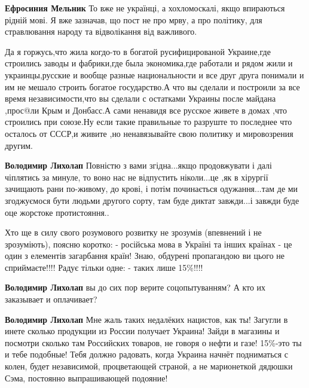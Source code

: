 \begin{itemize}
\begin{itemize}

\textbf{Ефросиния Мельник} То вже не українці, а хохломоскалі, якщо впираються рідній мові.
Я вже зазначав, що пост не про мрву, а про політику, для стравлювання народу та
відволікання від важливого.


Да я горжусь,что жила когдо-то в богатой русифицированой Украине,где строились заводы и фабрики,где была экономика,где работали и рядом жили и украинцы,русские и вообще разные национальности и все друг друга понимали и им не мешало строить богатое государство.А что вы сделали и построили за все время независимости,что вы сделали с остатками Украины после майдана ,прос@ли Крым и Донбасс.А сами ненавидя все русское живете в домах ,что строились при союзе.Ну если такие правильные то разруште то последнее что осталось от СССР,и живите ,но ненавязывайте свою политику и мировозрения другим.

\textbf{Володимир Лихолап} Повністю з вами згідна...якщо продовжувати і далі
чіплятись за минуле, то воно нас не відпустить ніколи...це ,як в
хірургії зачищають рани по-живому, до крові, і потім починається
одужання...там де ми згоджуємося бути людьми другого сорту, там буде диктат
завжди...і завжди буде оце жорстоке протистояння..
\end{itemize}


Хто ще в силу свого розумового розвитку не зрозумів (впевнений і не
зрозуміють), поясню коротко: - російська мова в Україні та інших країнах - це
один з елементів загарбання країн! Знаю, обдурені пропагандою ви цього не
сприймаєте!!!! Радує тільки одне: - таких лише 15\%!!!!

\begin{itemize}

\textbf{Володимир Лихолап} вы до сих пор верите соцопытуванням? А кто их заказывает и оплачивает?


\textbf{Володимир Лихолап} Мне жаль таких недалёких нацистов, как ты! Загугли в
инете сколько продукции из России получает Украина! Зайди в магазины и посмотри
сколько там Российских товаров, не говоря о нефти и газе! 15\%-это ты и тебе
подобные! Тебя должно радовать, когда Украина начнёт подниматься с колен, будет
независимой, процветающей страной, а не марионеткой дядюшки Сэма, постоянно
выпрашивающей подояние!


\end{itemize}
\end{itemize}
